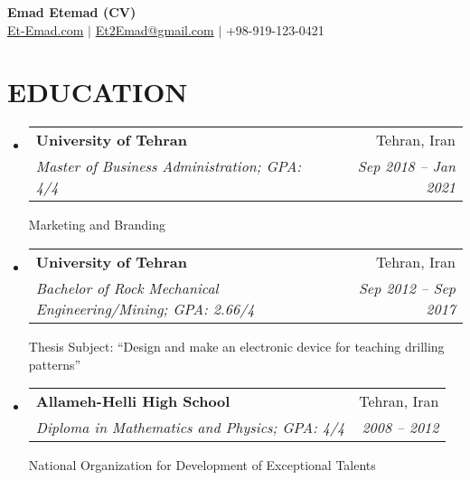 \documentclass[letterpaper,11pt]{article}
\makeatletter
\newcommand{\resumeSubheading}[4]{
  \vspace{5pt}\item
    \begin{tabular*}{0.97\textwidth}{l@{\extracolsep{\fill}}r}
      \textbf{#1} & #2 \\
      \textit{\small#3} & \textit{\small #4} \\
    \end{tabular*}\vspace{-5pt}
}
\newcommand{\resumeSubHeadingListStart}{\begin{itemize}[leftmargin=*]}
\newcommand{\resumeSubHeadingListEnd}{\end{itemize}}
\makeatother
\begin{document}
 \begin{center}
{\color{darkgray}
\textbf{{\LARGE {\centering Emad Etemad (CV)}} \vspace{7pt}}} \\

\href{https://Et-Emad.com}{{\color{teal}} Et-Emad.com} \hspace{5pt} $|$ \hspace{5pt}
 \href{mailto:Et2Emad@gmail.com} {{\color{teal}} Et2Emad@gmail.com} \hspace{5pt} $|$ \hspace{5pt}
{\color{teal}} +98-919-123-0421
 \hspace{5pt}
  \end{center}
\section{EDUCATION}
  \resumeSubHeadingListStart   
    \resumeSubheading
      {University of Tehran}{Tehran, Iran}
      {Master of Business Administration; GPA: 4/4 \vspace{4pt}}{Sep 2018 -- Jan 2021}
      {Marketing and Branding}

    \resumeSubheading
      {University of Tehran}{Tehran, Iran}
      {Bachelor of Rock Mechanical Engineering/Mining;  GPA: 2.66/4 \vspace{4pt}}{Sep 2012 -- Sep 2017}
      {Thesis Subject: “Design and make an electronic device for teaching drilling patterns”}

    \resumeSubheading
      {Allameh-Helli High School}{Tehran, Iran}
      {Diploma in Mathematics and Physics; GPA: 4/4 \vspace{4pt}}{2008 -- 2012}
      {National Organization for Development of Exceptional Talents}
  \resumeSubHeadingListEnd
  
\end{document}
